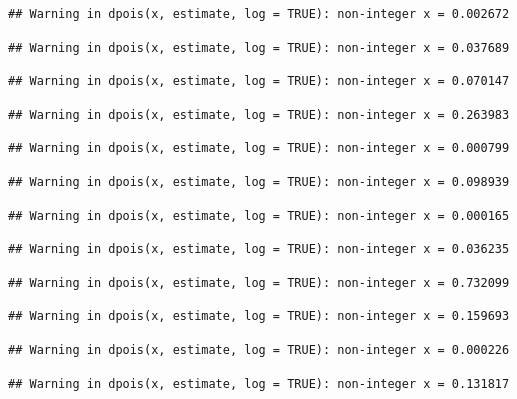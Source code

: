 \documentclass[]{article}
\begin{document}
\begin{verbatim}
## Warning in dpois(x, estimate, log = TRUE): non-integer x = 0.002672
\end{verbatim}

\begin{verbatim}
## Warning in dpois(x, estimate, log = TRUE): non-integer x = 0.037689
\end{verbatim}

\begin{verbatim}
## Warning in dpois(x, estimate, log = TRUE): non-integer x = 0.070147
\end{verbatim}

\begin{verbatim}
## Warning in dpois(x, estimate, log = TRUE): non-integer x = 0.263983
\end{verbatim}

\begin{verbatim}
## Warning in dpois(x, estimate, log = TRUE): non-integer x = 0.000799
\end{verbatim}

\begin{verbatim}
## Warning in dpois(x, estimate, log = TRUE): non-integer x = 0.098939
\end{verbatim}

\begin{verbatim}
## Warning in dpois(x, estimate, log = TRUE): non-integer x = 0.000165
\end{verbatim}

\begin{verbatim}
## Warning in dpois(x, estimate, log = TRUE): non-integer x = 0.036235
\end{verbatim}

\begin{verbatim}
## Warning in dpois(x, estimate, log = TRUE): non-integer x = 0.732099
\end{verbatim}

\begin{verbatim}
## Warning in dpois(x, estimate, log = TRUE): non-integer x = 0.159693
\end{verbatim}

\begin{verbatim}
## Warning in dpois(x, estimate, log = TRUE): non-integer x = 0.000226
\end{verbatim}

\begin{verbatim}
## Warning in dpois(x, estimate, log = TRUE): non-integer x = 0.131817
\end{verbatim}
\end{document}
